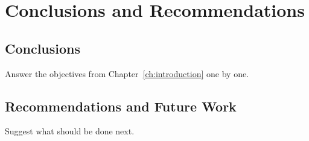 \chapter{Conclusions and Recommendations}
\label{ch:conclusions}

\section{Conclusions}
Answer the objectives from Chapter~\ref{ch:introduction} one by one.

\section{Recommendations and Future Work}
Suggest what should be done next.

